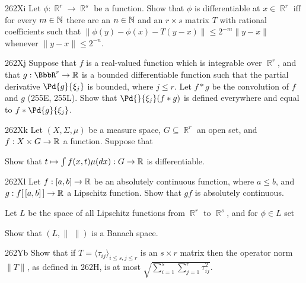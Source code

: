 {\spheader 262Xi Let $\phi:\BbbR^r\to\BbbR^s$ be a function.   Show that
$\phi$ is differentiable at $x\in\BbbR^r$ iff for every $m\in\Bbb N$
there are an $n\in\Bbb N$ and an $r\times s$ matrix $T$ with rational
coefficients
such that $\|\phi(y)-\phi(x)-T(y-x)\|\le 2^{-m}\|y-x\|$ whenever
$\|y-x\|\le 2^{-n}$.

\spheader 262Xj Suppose that $f$ is a real-valued function which is
integrable over $\BbbR^r$, and that $g:\BbbR^r\to\Bbb R$ is a bounded
differentiable function such that the partial derivative $\Pd{g}{\xi_j}$
is bounded, where $j\le r$.   Let $f*g$ be
the convolution of $f$ and $g$ (255E, 255L).
Show that $\Pd{}{\xi_j}(f*g)$
is defined everywhere and equal to $f*\Pd{g}{\xi_j}$.   

\spheader 262Xk Let $(X,\Sigma,\mu)$ be a measure space,
$G\subseteq\BbbR^r$ an open set, and $f:X\times G\to\Bbb R$ a function.
Suppose that


\noindent Show that $t\mapsto\int f(x,t)\mu(dx):G\to\Bbb R$ is
differentiable.  

\spheader 262Xl Let $f:[a,b]\to\Bbb R$ 
be an absolutely continuous
function, where $a\le b$, and $g:f[\,[a,b]\,]\to\Bbb R$ a Lipschitz
function.   Show that $gf$ is absolutely continuous.

Let $L$ be the space of all Lipschitz functions from
$\BbbR^r$ to $\BbbR^s$, and for $\phi\in L$ set


\noindent Show that $(L,\|\,\,\|)$ is a Banach space.

\spheader 262Yb Show that if
$T=\langle\tau_{ij}\rangle_{i\le s,j\le r}$ is an $s\times r$ matrix
then the operator norm $\|T\|$, as defined in 262H, is at most
$\sqrt{\sum_{i=1}^s\sum_{j=1}^r\tau_{ij}^2}$.

}
